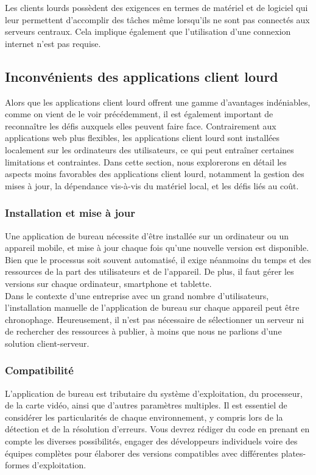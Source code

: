 \documentclass[a4paper, 12pt, french]{article}
\begin{document}
				Les clients lourds possèdent des exigences en termes de matériel et de logiciel qui leur permettent d'accomplir des tâches même lorsqu'ils ne sont pas connectés aux serveurs centraux. Cela implique également que l'utilisation d'une connexion internet n'est pas requise.
			
		\subsection{Inconvénients des applications client lourd}
			Alors que les applications client lourd offrent une gamme d'avantages indéniables, comme on vient de le voir précédemment, il est également important de reconnaître les défis auxquels elles peuvent faire face. Contrairement aux applications web plus flexibles, les applications client lourd sont installées localement sur les ordinateurs des utilisateurs, ce qui peut entraîner certaines limitations et contraintes. Dans cette section, nous explorerons en détail les aspects moins favorables des applications client lourd, notamment la gestion des mises à jour, la dépendance vis-à-vis du matériel local, et les défis liés au coût.
			
			\subsubsection{Installation et mise à jour}
				Une application de bureau nécessite d'être installée sur un ordinateur ou un appareil mobile, et mise à jour chaque fois qu'une nouvelle version est disponible. Bien que le processus soit souvent automatisé, il exige néanmoins du temps et des ressources de la part des utilisateurs et de l'appareil. De plus, il faut gérer les versions sur chaque ordinateur, smartphone et tablette.\\

				Dans le contexte d'une entreprise avec un grand nombre d'utilisateurs, l'installation manuelle de l'application de bureau sur chaque appareil peut être chronophage. Heureusement, il n'est pas nécessaire de sélectionner un serveur ni de rechercher des ressources à publier, à moins que nous ne parlions d'une solution client-serveur.

			\subsubsection{Compatibilité}
				L'application de bureau est tributaire du système d'exploitation, du processeur, de la carte vidéo, ainsi que d'autres paramètres multiples. Il est essentiel de considérer les particularités de chaque environnement, y compris lors de la détection et de la résolution d'erreurs. Vous devrez rédiger du code en prenant en compte les diverses possibilités, engager des développeurs individuels voire des équipes complètes pour élaborer des versions compatibles avec différentes plates-formes d'exploitation.
				
\end{document}
